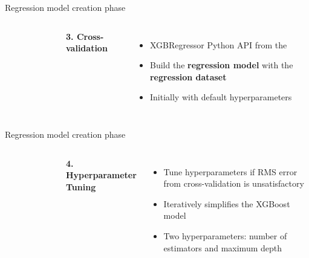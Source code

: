 \begin{frame}{Regression model creation phase}
    \begin{columns}
        \vspace{-1cm}
        \begin{figure}[!ht]
            \centering
            
        \end{figure}

        
        \textbf{\textcolor{omni-spring-pastels-8}{3. Cross-validation}}
        \begin{itemize}
            \item XGBRegressor Python API from the 
            \item Build the \textbf{regression model} with the \textbf{regression dataset}
            \item Initially with default hyperparameters
        \end{itemize}
    \end{columns}
\end{frame}

\begin{frame}{Regression model creation phase}
    \begin{columns}
        \vspace{-1cm}
        \begin{figure}[!ht]
            \centering
            
        \end{figure}

        
        \textbf{\textcolor{omni-spring-pastels-8}{4. Hyperparameter Tuning}}
        \begin{itemize}
            \item Tune hyperparameters if RMS error from cross-validation is unsatisfactory
            \item Iteratively simplifies the XGBoost model
            \item Two hyperparameters: number of estimators and maximum depth
        \end{itemize}
    \end{columns}
\end{frame}

